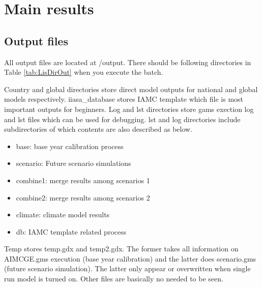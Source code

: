 \documentclass[10pt,a4paper,titlepage,dvipdfmx]{book}
\begin{document}
\chapter{\label{chp:MainRes}Main results}

\section{\label{sec:OutFile}Output files}

    All output files are located at /output. There should be following directories in Table \ref{tab:LisDirOut} when you execute the batch.

Country and global directories store direct model outputs for national and global models respectively. iiasa\_database stores IAMC template which file is most important outputs for beginners.
Log and lst directories store gams exection log and lst files which can be used for debugging. lst and log directories include subdirectories of which contents are also described as below.  
\begin{itemize}
\item base: base year calibration process 
\item scenario: Future scenario simulations 
\item combine1: merge results among scenarios 1
\item combine2: merge results among scenarios 2
\item climate: climate model results
\item db: IAMC template related process
\end{itemize}
  Temp stores temp.gdx and temp2.gdx. 
The former takes all information on AIMCGE.gms execution (base year calibration) and the latter does scenario.gms (future scenario simulation). The latter only appear or overwritten when single run model is turned on. Other files are basically no needed to be seen.
\end{document}
